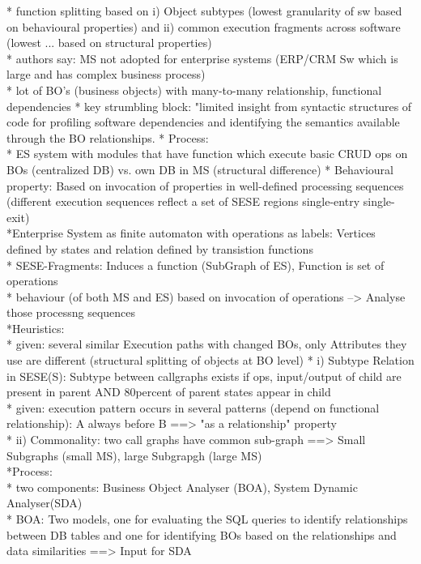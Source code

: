 * function splitting based on i) Object subtypes (lowest granularity of sw based on behavioural properties) and ii) common execution fragments across software (lowest ... based on structural properties) \\
* authors say: MS not adopted for enterprise systems (ERP/CRM Sw which is large and has complex business process) \\
* lot of BO's (business objects) with many-to-many relationship, functional dependencies
* key strumbling block: "limited insight from syntactic structures of code for profiling software dependencies and identifying the semantics available through the BO relationships.
* Process:\\
* ES system with modules that have function which execute basic CRUD ops on BOs (centralized DB) vs. own DB in MS (structural difference)
* Behavioural property: Based on invocation of properties in well-defined processing sequences (different execution sequences reflect a set of SESE regions   single-entry single-exit) \\
*Enterprise System as finite automaton with operations as labels: Vertices defined by states and relation defined by transistion functions \\
* SESE-Fragments: Induces a function (SubGraph of ES), Function is set of operations \\
* behaviour (of both MS and ES) based on invocation of operations --> Analyse those processng sequences \\
*Heuristics: \\
* given: several similar Execution paths with changed BOs, only Attributes they use are different (structural splitting of objects at BO level)
* i) Subtype Relation in SESE(S): Subtype between callgraphs exists if ops, input/output of child are present in parent AND 80percent of parent states appear in child \\
* given: execution pattern occurs in several patterns (depend on functional relationship): A always before B ==> "as a relationship" property \\
* ii) Commonality: two call graphs have common sub-graph ==> Small Subgraphs (small MS), large Subgrapgh (large MS)\\
*Process:\\
* two components: Business Object Analyser (BOA), System Dynamic Analyser(SDA) \\
* BOA: Two models, one for evaluating the SQL queries to identify relationships between DB tables and one for identifying BOs based on the relationships and data similarities ==> Input for SDA \\
